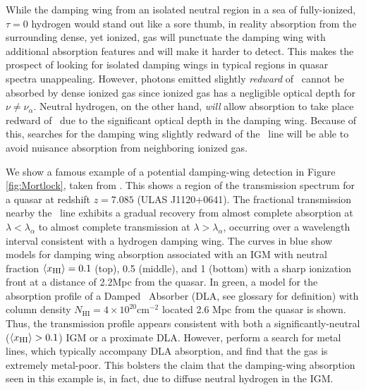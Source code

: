 While the damping wing from an isolated neutral region in a sea of fully-ionized, $\tau = 0$ hydrogen would stand out like a sore thumb, in reality absorption from the surrounding dense, yet ionized, gas will punctuate the damping wing with additional absorption features and will make it harder to detect. This makes the prospect of looking for isolated damping wings in typical regions in quasar spectra unappealing. However, photons emitted slightly \textit{redward} of \lya\ cannot be absorbed by dense ionized gas since ionized gas has a negligible optical depth for $\nu \neq \nu_{\alpha}$. Neutral hydrogen, on the other hand, \textit{will} allow absorption to take place redward of \lya\ due to the significant optical depth in the damping wing. Because of this, searches for the damping wing slightly redward of the \lya\ line will be able to avoid nuisance absorption from neighboring ionized gas.


We show a famous example of a potential damping-wing detection in Figure \ref{fig:Mortlock}, taken from \cite{Mortlock2011}. This shows a region of the transmission spectrum for a quasar at redshift $z = 7.085$ (ULAS J1120+0641). The fractional transmission nearby the \lya\ line exhibits a gradual recovery from almost complete absorption at $\lambda < \lambda_{\alpha}$ to almost complete transmission at $\lambda > \lambda_{\alpha}$, occurring over a wavelength interval consistent with a hydrogen damping wing. The curves in blue show models for damping wing absorption associated with an IGM with neutral fraction $\langle x_{\text{HI}}\rangle = 0.1$ (top), 0.5 (middle), and 1 (bottom) with a sharp ionization front at a distance of 2.2Mpc from the quasar. In green, a model for the absorption profile of a Damped \lya\ Absorber (DLA, see glossary for definition) with column density $N_{\text{HI}} = 4\times10^{20}\text{cm}^{-2}$ located 2.6 Mpc from the quasar is shown. Thus, the transmission profile appears consistent with both a significantly-neutral ($\langle x_{\text{HI}}\rangle > 0.1$) IGM or a proximate DLA. However, \cite{Simcoe} perform a search for metal lines, which typically accompany DLA absorption, and find that the gas is extremely metal-poor. This bolsters the claim that the damping-wing absorption seen in this example is, in fact, due to diffuse neutral hydrogen in the IGM. 


